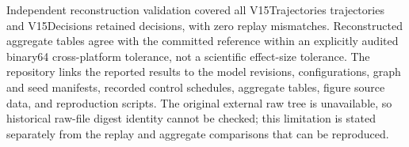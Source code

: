 \documentclass[12pt]{article}
\begin{document}
Independent reconstruction validation covered all
\csname V15Trajectories\endcsname{} trajectories and
\csname V15Decisions\endcsname{} retained decisions, with zero replay
mismatches.  Reconstructed aggregate tables agree with the committed reference
within an explicitly audited binary64 cross-platform tolerance, not a
scientific effect-size tolerance.  The repository links the reported results
to the model revisions, configurations, graph and seed manifests, recorded
control schedules, aggregate tables, figure source data, and reproduction
scripts.  The original external raw tree is unavailable, so historical raw-file
digest identity cannot be checked; this limitation is stated separately from
the replay and aggregate comparisons that can be reproduced.


{\small

}
\end{document}
